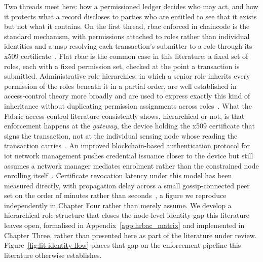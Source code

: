 \label{subsec:lit_privacy}

Two threads meet here: how a permissioned ledger decides who may act, and
how it protects what a record discloses to parties who are entitled to see
that it exists but not what it contains. On the first thread, \gls{rbac}
enforced in chaincode is the standard mechanism, with permissions attached
to roles rather than individual identities and a \gls{msp} resolving each
transaction's submitter to a role through its
\gls{x509} certificate~\cite{mdpiAccessControl, hyperledger2022msp}. Flat
\gls{rbac} is the common case in this literature: a fixed set of roles,
each with a fixed permission set, checked at the point a transaction is
submitted. Administrative role hierarchies, in which a senior role
inherits every permission of the roles beneath it in a partial order, are
well established in access-control theory more broadly and are used to
express exactly this kind of inheritance without duplicating permission
assignments across roles~\cite{lu2022revocation}. What the Fabric
access-control literature consistently shows, hierarchical or not, is that
enforcement happens at the \emph{gateway}, the device holding the
\gls{x509} certificate that signs the transaction, not at the individual
sensing node whose reading the transaction
carries~\cite{mdpiAccessControl, yavari2020blockchain}. An improved
blockchain-based authentication protocol for \gls{iot} network management
pushes credential issuance closer to the device but still assumes a
network manager mediates enrolment rather than the constrained node
enrolling itself~\cite{yavari2020blockchain}. Certificate revocation
latency under this model has been measured directly, with propagation
delay across a small gossip-connected peer set on the order of minutes
rather than seconds~\cite{lu2022revocation}, a figure we reproduce
independently in Chapter Four rather than merely assume. We develop a
hierarchical role structure that closes the node-level identity gap this
literature leaves open, formalised in Appendix~\ref{app:hrbac_matrix} and
implemented in Chapter Three, rather than presented here as part of the
literature under review. Figure~\ref{fig:lit-identity-flow} places that
gap on the enforcement pipeline this literature otherwise establishes.

